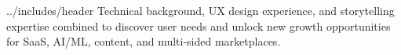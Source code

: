 \documentclass[letterpaper]{article}
\begin{document}
\fontsize{10pt}{13pt}\selectfont

 {../includes/header}
Technical background, UX design experience, and storytelling expertise combined to discover user needs and unlock new growth opportunities for SaaS, AI/ML, content, and multi-sided marketplaces.

\vspace{6pt}\par
{}
\expinstapageQ[1,2,3,4,5,6,7]
\expnerdwalletQ[1,2,3,4,5]
\newpage
\expstubhubQ[1,2,3,4]
\expaenetworksQ[1,2,3]
\expadweekQ[1,2,3,4]

\vspace{8pt}\par
{}
\education
\end{document}

